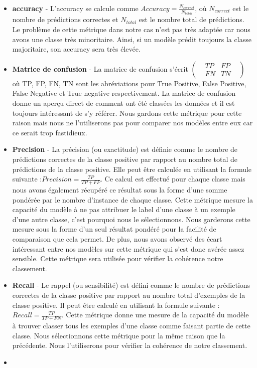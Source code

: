 \documentclass{ceri/sty/rapport}
\begin{document}
\begin{itemize}
	\item \textbf{accuracy} - L'accuracy se calcule comme $Accuracy = \frac{N_{correct}}{N_{total}}$, où $N_{correct}$ est le nombre de prédictions correctes et $N_{total}$ est le nombre total de prédictions. Le problème de cette métrique dans notre cas n'est pas très adaptée car nous avons une classe très minoritaire. Ainsi, si un modèle prédit toujours la classe majoritaire, son accuracy sera très élevée.\\

	\item \textbf{Matrice de confusion} - La matrice de confusion s'écrit
		$
		\begin{pmatrix}
			& TP & FP & \\
			& FN & TN & 
		\end{pmatrix}
		$ où TP, FP, FN, TN sont les abréviations pour True Positive, False Positive, False Negative et True negative respectivement. La matrice de confusion donne un aperçu direct de comment ont été classées les données et il est toujours intéressant de s'y référer. Nous gardons cette métrique pour cette raison mais nous ne l'utiliserons pas pour comparer nos modèles entre eux car ce serait trop fastidieux.\\
		
	\item \textbf{Precision} - La précision (ou exactitude) est définie comme le nombre de prédictions correctes de la classe positive par rapport au nombre total de prédictions de la classe positive. Elle peut être calculée en utilisant la formule suivante :$Precision = \frac{TP}{TP+FP}$. Ce calcul est effectué pour chaque classe mais nous avons également récupéré ce résultat sous la forme d'une somme pondérée par le nombre d'instance de chaque classe. Cette métrique mesure la capacité du modèle à ne pas attribuer le label d'une classe à un exemple d'une autre classe, c'est pourquoi nous le sélectionnons. Nous garderons cette mesure sous la forme d'un seul résultat pondéré pour la facilité de comparaison que cela permet. De plus, nous avons observé des écart intéressant entre nos modèles sur cette métrique qui s'est donc avérée assez sensible. Cette métrique sera utilisée pour vérifier la cohérence notre classement.\\

	\item \textbf{Recall} - Le rappel (ou sensibilité) est défini comme le nombre de prédictions correctes de la classe positive par rapport au nombre total d'exemples de la classe positive. Il peut être calculé en utilisant la formule suivante : $Recall = \frac{TP}{TP+FN}$. Cette métrique donne une mesure de la capacité du modèle à trouver classer tous les exemples d'une classe comme faisant partie de cette classe. Nous sélectionnons cette métrique pour la même raison que la précédente. Nous l'utiliserons pour vérifier la cohérence de notre classement.
	\item 


\end{itemize}
\end{document}
